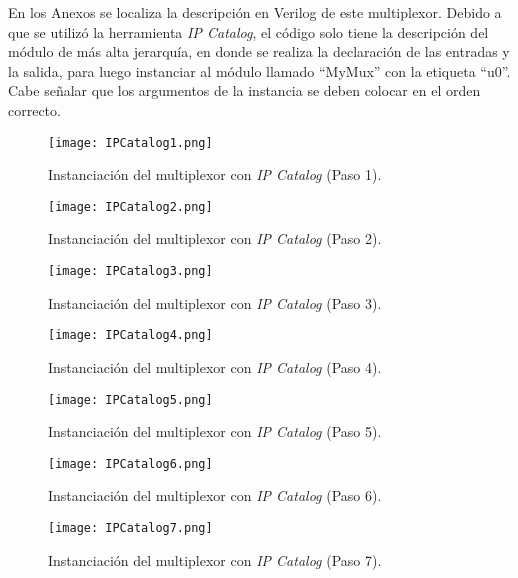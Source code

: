 En los Anexos se localiza la descripción en Verilog de este multiplexor. Debido a que se utilizó la herramienta \textit{IP Catalog}, el código solo tiene la descripción del módulo de más alta jerarquía, en donde se realiza la declaración de las entradas y la salida, para luego instanciar al módulo llamado ``MyMux'' con la etiqueta ``u0''. Cabe señalar que los argumentos de la instancia se deben colocar en el orden correcto.

\begin{figure}[ht]
	\centering
	\texttt{[image: IPCatalog1.png]}
	\caption{Instanciación del multiplexor con \textit{IP Catalog} (Paso 1). \label{fig:ipcatalog1}}
\end{figure}

\begin{figure}[ht]
	\centering
	\texttt{[image: IPCatalog2.png]}
	\caption{Instanciación del multiplexor con \textit{IP Catalog} (Paso 2). \label{fig:ipcatalog2}}
\end{figure}

\begin{figure}[ht]
	\centering
	\texttt{[image: IPCatalog3.png]}
	\caption{Instanciación del multiplexor con \textit{IP Catalog} (Paso 3). \label{fig:ipcatalog3}}
\end{figure}

\begin{figure}[ht]
	\centering
	\texttt{[image: IPCatalog4.png]}
	\caption{Instanciación del multiplexor con \textit{IP Catalog} (Paso 4). \label{fig:ipcatalog4}}
\end{figure}

\begin{figure}[ht]
	\centering
	\texttt{[image: IPCatalog5.png]}
	\caption{Instanciación del multiplexor con \textit{IP Catalog} (Paso 5). \label{fig:ipcatalog5}}
\end{figure}

\begin{figure}[ht]
	\centering
	\texttt{[image: IPCatalog6.png]}
	\caption{Instanciación del multiplexor con \textit{IP Catalog} (Paso 6). \label{fig:ipcatalog6}}
\end{figure}

\begin{figure}[ht]
	\centering
	\texttt{[image: IPCatalog7.png]}
	\caption{Instanciación del multiplexor con \textit{IP Catalog} (Paso 7). \label{fig:ipcatalog7}}
\end{figure}

